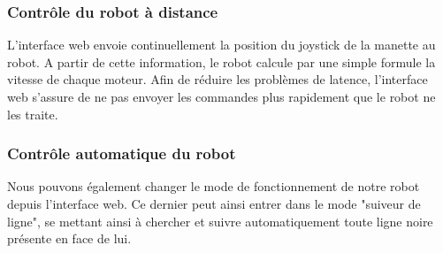 \subsubsection*{Contrôle du robot à distance}
L'interface web envoie continuellement la position du joystick de la manette au robot. A partir de cette information, le robot calcule par une simple formule la vitesse de chaque moteur. Afin de réduire les problèmes de latence, l'interface web s'assure de ne pas envoyer les commandes plus rapidement que le robot ne les traite.

\subsubsection*{Contrôle automatique du robot}
Nous pouvons également changer le mode de fonctionnement de notre robot depuis l'interface web. Ce dernier peut ainsi entrer dans le mode "suiveur de ligne", se mettant ainsi à chercher et suivre automatiquement toute ligne noire présente en face de lui.